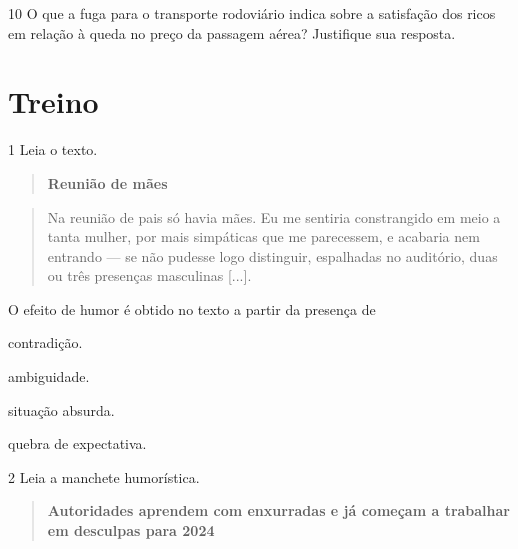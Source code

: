 \num{10} O que a fuga para o transporte rodoviário indica sobre a
satisfação dos ricos em relação à queda no preço da passagem aérea?
Justifique sua resposta.


\section{Treino}

\num{1} Leia o texto.

\begin{quote}
\centering\textbf{Reunião de mães}
\end{quote}


\begin{quote}
Na reunião de pais só havia mães. Eu me sentiria constrangido em meio a
tanta mulher, por mais simpáticas que me parecessem, e acabaria nem
entrando --- se não pudesse logo distinguir, espalhadas no auditório,
duas ou três presenças masculinas {[}...{]}.

\end{quote}

O efeito de humor é obtido no texto a partir da presença de

\begin{escolha}
\item contradição.

\item ambiguidade.

\item situação absurda.

\item quebra de expectativa.
\end{escolha}

\num{2} Leia a manchete humorística.

\begin{quote}
\textbf{Autoridades aprendem com enxurradas e já começam a trabalhar em
desculpas para 2024}

\end{quote}

